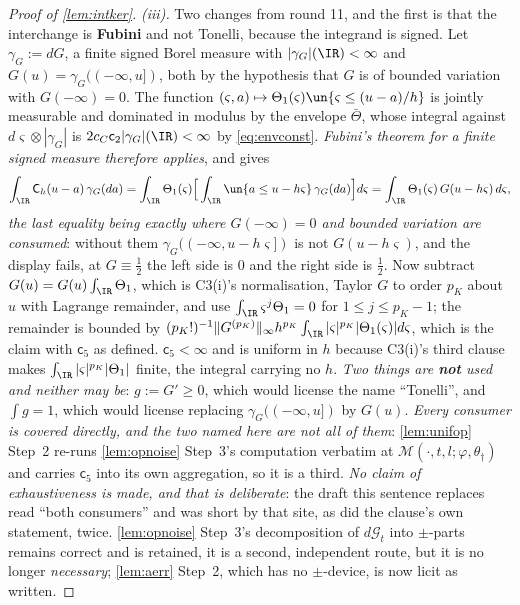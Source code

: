 \begin{proof}[Proof of \cref{lem:intker}]
\emph{(iii).} Two changes from round 11, and the first is that the interchange is \textbf{Fubini}
and not Tonelli, because the integrand is signed. Let $\gamma_G:=dG$, a finite signed Borel measure with
$|\gamma_G|(\IR)<\infty$ and $G(u)=\gamma_G((-\infty,u])$, both by the hypothesis that $G$ is of bounded
variation with $G(-\infty)=0$. The function
$(\varsigma,a)\mapsto\Theta_1(\varsigma)\un\{\varsigma\le(u-a)/h\}$ is jointly measurable and dominated
in modulus by the envelope $\bar\Theta$, whose integral against
$d\varsigma\otimes|\gamma_G|$ is $2c_C\mathsf c_2|\gamma_G|(\IR)<\infty$ by \eqref{eq:envconst}.
\emph{Fubini's theorem for a finite signed measure therefore applies}, and gives
\[
\int_\IR\mathsf C_h(u-a)\,\gamma_G(da)
=\int_{\IR}\Theta_1(\varsigma)\Big[\int_\IR\un\{a\le u-h\varsigma\}\,\gamma_G(da)\Big]d\varsigma
=\int_{\IR}\Theta_1(\varsigma)\,G(u-h\varsigma)\,d\varsigma ,
\]
\emph{the last equality being exactly where $G(-\infty)=0$ and bounded variation are consumed}: without
them $\gamma_G((-\infty,u-h\varsigma])$ is not $G(u-h\varsigma)$, and the display fails, at
$G\equiv\tfrac12$ the left side is $0$ and the right side is $\tfrac12$. Now subtract
$G(u)=G(u)\int_{\IR}\Theta_1$, which is C3(i)'s normalisation, Taylor $G$ to order $p_K$ about
$u$ with Lagrange remainder, and use $\int_{\IR}\varsigma^{j}\Theta_1=0$ for
$1\le j\le p_K-1$; the remainder is bounded by
$(p_K!)^{-1}\|G^{(p_K)}\|_\infty h^{p_K}\int_{\IR}|\varsigma|^{p_K}|\Theta_1(\varsigma)|d\varsigma$,
which is the claim with $\mathsf c_5$ as defined. $\mathsf c_5<\infty$ and is uniform in $h$ because
C3(i)'s third clause makes $\int_\IR|\varsigma|^{p_K}|\Theta_1|$ finite, the integral carrying no $h$.
\emph{Two things are \textbf{not} used and neither may be}: $g:=G'\ge0$, which
would license the name ``Tonelli'', and $\int g=1$, which would license replacing
$\gamma_G((-\infty,u])$ by $G(u)$. \emph{Every consumer is covered directly, and the two named here
are not all of them}: \cref{lem:unifop} Step~2 re-runs \cref{lem:opnoise} Step~3's computation
verbatim at $\mathcal M(\cdot,t,l;\varphi,\theta_\dagger)$ and carries $\mathsf c_5$ into its own
aggregation, so it is a third. \emph{No claim of exhaustiveness is made, and that is deliberate}: the
draft this sentence replaces read ``both consumers'' and was short by that site, as did the clause's
own statement, twice. \cref{lem:opnoise}
Step~3's decomposition of $d\mathcal G_t$ into $\pm$-parts remains correct and is retained, it is a
second, independent route, but it is no longer \emph{necessary}; \cref{lem:aerr} Step~2, which has no
$\pm$-device, is now licit as written.


\end{proof}
